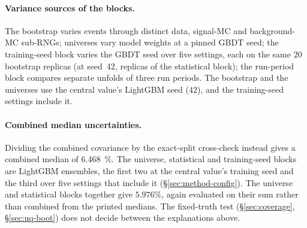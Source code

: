 \paragraph{Variance sources of the blocks.} The bootstrap varies events through distinct data, signal-MC and background-MC sub-RNGs; universes vary model weights at a pinned GBDT seed; the training-seed block varies the GBDT seed over five settings, each on the same $20$ bootstrap replicas (at seed~42, replicas of the statistical block); the run-period block compares separate unfolds of three run periods. The bootstrap and the universes use the central value's LightGBM seed ($42$), and the training-seed settings include it.

\paragraph{Combined median uncertainties.} Dividing the combined covariance by the exact-split cross-check instead gives a combined median of \SI{6.468}{\percent}. The universe, statistical and training-seed blocks are LightGBM ensembles, the first two at the central value's training seed and the third over five settings that include it (\S\ref{sec:method-config}). The universe and statistical blocks together give $5.976\%$, again evaluated on their sum rather than combined from the printed medians. The fixed-truth test (\S\ref{sec:coverage}, \S\ref{sec:uq-boot}) does not decide between the explanations above.

